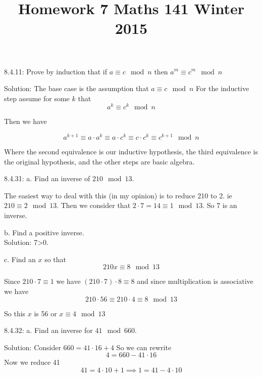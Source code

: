 \documentclass[16 pt]{amsart}
\theoremstyle{definition}
\theoremstyle{remark}
\numberwithin{equation}{subsection}
\begin{document}
\title{Homework 7 Maths 141 Winter 2015}
\maketitle 


8.4.11: Prove by induction that if $a\equiv c \mod{n}$ then $a^m\equiv c^m \mod{n}$

\vspace{1in}

Solution:
The base case is the assumption that $a\equiv c\mod{n}$ For the inductive step assume for some $k$ that
\[
a^k \equiv c^k \mod{n}
\]

Then we have

\[
a^{k+1} \equiv a\cdot a^k \equiv a\cdot c^k \equiv c\cdot c^k \equiv c^{k+1} \mod{n}
\]

Where the second equivalence is our inductive hypothesis, the third equivalence is the original hypothesis, and the other steps are basic algebra.



\newpage

8.4.31: a. Find an inverse of $210 \mod{13}$.

\vspace{.5in}

The easiest way to deal with this (in my opinion) is to reduce 210 to 2.  ie $210\equiv 2\mod{13}$.  Then we consider that $2\cdot 7 = 14 \equiv 1\mod{13}$.  So $7$ is an inverse.

\vspace{.5in}

b. Find a positive inverse.\\
Solution: 7>0. 

\vspace{.5in}

c. Find an $x$ so that
\[
210x \equiv 8 \mod{13}
\]

Since $210\cdot 7 \equiv 1$ we have $(210 \cdot 7)\cdot 8 \equiv 8$ and since multiplication is associative we have
\[
210\cdot 56 \equiv 210 \cdot 4 \equiv 8 \mod{13}
\]

So this $x$ is 56 or $x\equiv 4\mod{13}$

\newpage


8.4.32: a. Find an inverse for $41\mod{660}$.

\vspace{.5in}

Solution: Consider $660 = 41\cdot 16 + 4$ 
So we can rewrite 
\[
4 = 660 - 41\cdot 16
\] 
Now we reduce 41
\[
41 = 4\cdot 10 + 1 \implies 1 = 41 - 4\cdot 10
\]
\end{document}
